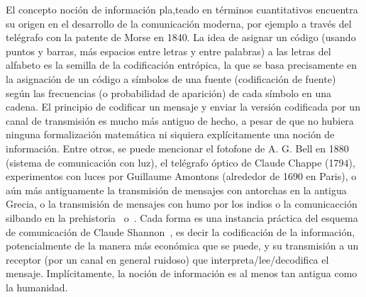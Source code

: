 \label{Sec:SZ:Introduccion}


El  concepto noci\'on  de  informaci\'on pla,teado  en t\'erminos  cuantitativos
 encuentra su origen en el desarrollo  de la comunicaci\'on moderna, por ejemplo
 a trav\'es del tel\'egrafo con la patente  de Morse en 1840. La idea de asignar
 un  c\'odigo (usando  puntos  y barras,  m\'as espacios  entre  letras y  entre
 palabras)  a  las letras  del  alfabeto  es  la  semilla de  la  codificaci\'on
 entr\'opica, la  que se basa precisamente  en la asignaci\'on de  un c\'odigo a
 s\'imbolos de una fuente (codificaci\'on  de fuente) seg\'un las frecuencias (o
 probabilidad de aparici\'on)  de cada s\'imbolo en una cadena.  El principio de
 codificar  un  mensaje  y  enviar  la versi\'on  codificada  por  un  canal  de
 transmisi\'on  es mucho  m\'as antiguo  de  hecho, a  pesar de  que no  hubiera
 ninguna formalizaci\'on matem\'atica ni  siquiera expl\'icitamente una noci\'on
 de informaci\'on.  Entre otros, se puede  mencionar el fotofone de A.  G.  Bell
 en  1880~\cite{Bel1880,   Bru90}  (sistema  de  comunicaci\'on   con  luz),  el
 tel\'egrafo  \'optico  de Claude  Chappe  (1794),  experimentos con  luces  por
 Guillaume Amontons (alrededor de 1690 en  Paris), o a\'un m\'as antiguamente la
 transmisi\'on  de   mensajes  con  antorchas   en  la  antigua  Grecia,   o  la
 transmisi\'on de mensajes con humo por los indios o la comunicacci\'on silbando
 en  la  prehistoria~\cite{Mon08}  o~\cite[Cap.~3]{Arn01}.  Cada  forma  es  una
 instancia    pr\'actica   del    esquema    de    comunicaci\'on   de    Claude
 Shannon~\cite{Sha48, ShaWea64}, es decir la codificaci\'on de la informaci\'on,
 potencialmente de la manera m\'as econ\'omica  que se puede, y su transmisi\'on
 a un receptor  (por un canal en general  ruidoso) que interpreta/lee/decodifica
 el mensaje.   Impl\'icitamente, la  noci\'on de informaci\'on  es al  menos tan
 antigua como la humanidad.

